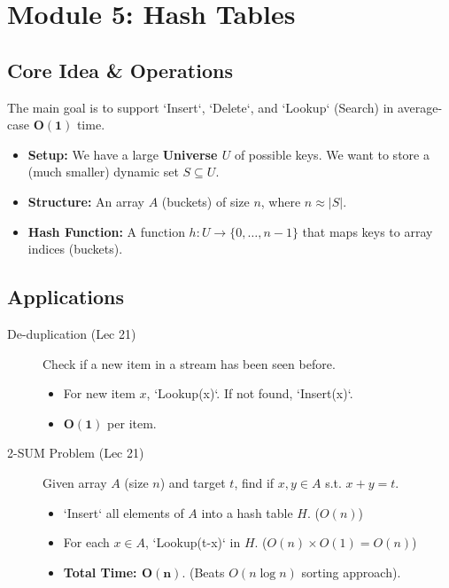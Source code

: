 
\section{Module 5: Hash Tables}

\subsection{Core Idea \& Operations}
The main goal is to support `Insert`, `Delete`, and `Lookup` (Search) in average-case $\mathbf{O(1)}$ time.
\begin{itemize}
    \item \textbf{Setup:} We have a large \textbf{Universe $U$} of possible keys. We want to store a (much smaller) dynamic set $S \subseteq U$.
    \item \textbf{Structure:} An array $A$ (buckets) of size $n$, where $n \approx |S|$.
    \item \textbf{Hash Function:} A function $h: U \to \{0, \dots, n-1\}$ that maps keys to array indices (buckets).
\end{itemize}

\subsection{Applications}
\begin{description}
    \item[De-duplication (Lec 21)] Check if a new item in a stream has been seen before.
    \begin{itemize}
        \item For new item $x$, `Lookup(x)`. If not found, `Insert(x)`.
        \item $\mathbf{O(1)}$ per item.
    \end{itemize}
    \item[2-SUM Problem (Lec 21)] Given array $A$ (size $n$) and target $t$, find if $x, y \in A$ s.t. $x+y=t$.
    \begin{itemize}
        \item `Insert` all elements of $A$ into a hash table $H$. ($O(n)$)
        \item For each $x \in A$, `Lookup(t-x)` in $H$. ($O(n) \times O(1) = O(n)$)
        \item \textbf{Total Time: $\mathbf{O(n)}$}. (Beats $O(n \log n)$ sorting approach).
    \end{itemize}
\end{description}

